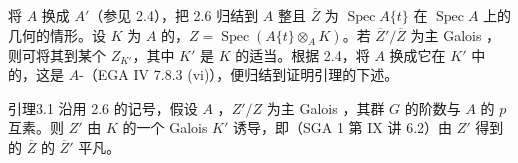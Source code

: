 将 $A$ 换成 $A'$（参见 2.4），把 2.6 归结到 $A$ 整且 $\overline Z$ 为 $\operatorname{Spec}A\{t\}$ 在 $\operatorname{Spec}A$ 上的几何的情形。设 $K$ 为 $A$ 的，$Z=\operatorname{Spec}(A\{t\}\otimes_A K)$。若 $\overline Z'/\overline Z$ 为主 Galois ，则可将其到某个 $Z_{K'}$，其中 $K'$ 是 $K$ 的适当。根据 2.4，将 $A$ 换成它在 $K'$ 中的，这是 $A$-（EGA IV 7.8.3 (vi)），便归结到证明引理的下述。
\begin{SGAresult}{引理}{3.1}
沿用 2.6 的记号，假设 $A$ ，$Z'/Z$ 为主 Galois ，其群 $G$ 的阶数与 $A$ 的 $p$ 互素。则 $Z'$ 由 $K$ 的一个 Galois  $K'$ 诱导，即（SGA 1 第 IX 讲 6.2）由 $Z'$ 得到的 $\overline Z$ 的 $\overline Z'$ 平凡。
\end{SGAresult}
